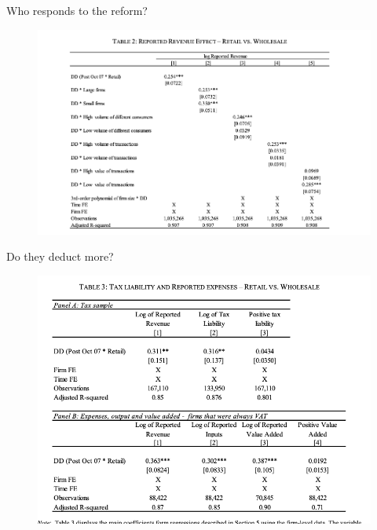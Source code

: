 \documentclass{beamer}
\begin{document}
\begin{frame}{Who responds to the reform?}
\begin{figure}
    \centering
    \includegraphics[width=\textwidth]{Paper Presentations/Consumers as Tax Auditors/T1.png}
    \label{fig:enter-label}
\end{figure}
\end{frame}

\begin{frame}{Do they deduct more?}
\begin{figure}
    \centering
    \includegraphics[width=\textwidth]{Paper Presentations/Consumers as Tax Auditors/T2.png}
    \label{fig:enter-label}
\end{figure}
\end{frame}
\end{document}
